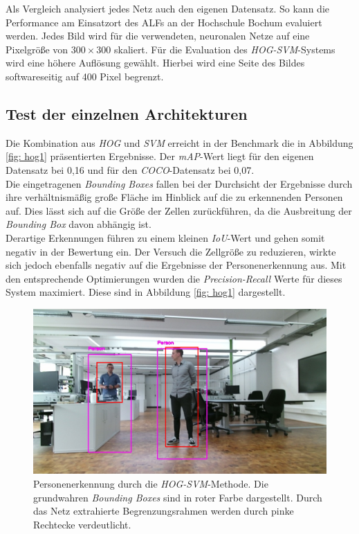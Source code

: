Als Vergleich analysiert jedes Netz auch den eigenen Datensatz. So kann die Performance am Einsatzort des ALFs an der Hochschule Bochum evaluiert werden. Jedes Bild wird für die verwendeten, neuronalen Netze auf eine Pixelgröße von $300 \times 300$ skaliert. Für die Evaluation des \textit{HOG-SVM}-Systems wird eine höhere Auflösung gewählt. Hierbei wird eine Seite des Bildes softwareseitig auf 400 Pixel begrenzt.

\subsection{Test der einzelnen Architekturen}

Die Kombination aus \textit{HOG} und \textit{SVM} erreicht in der Benchmark die in Abbildung \ref{fig: hog1} präsentierten Ergebnisse. Der \textit{mAP}-Wert liegt für den eigenen Datensatz bei 0,16 und für den \textit{COCO}-Datensatz bei 0,07.\\






 Die eingetragenen \textit{Bounding Boxes} fallen bei der Durchsicht der Ergebnisse durch ihre verhältnismäßig große Fläche im Hinblick auf die zu erkennenden Personen auf. Dies lässt sich auf die Größe der Zellen zurückführen, da die Ausbreitung der \textit{Bounding Box} davon abhängig ist.\\
 
 Derartige Erkennungen führen zu einem kleinen \textit{IoU}-Wert und gehen somit negativ in der Bewertung ein. Der Versuch die Zellgröße zu reduzieren, wirkte sich jedoch ebenfalls negativ auf die Ergebnisse der Personenerkennung aus. Mit den entsprechende Optimierungen wurden die \textit{Precision-Recall} Werte für dieses System maximiert. Diese sind in Abbildung \ref{fig: hog1} dargestellt.\\
	\begin{figure}[H]
	\centering
	\includegraphics[width=1\textwidth]{Bilder/iouhog.png}
	\caption{Personenerkennung durch die \textit{HOG-SVM}-Methode. Die grundwahren \textit{Bounding Boxes} sind in roter Farbe dargestellt. Durch das Netz extrahierte Begrenzungsrahmen werden durch pinke Rechtecke verdeutlicht.}
	\label{fig: hogiou}
\end{figure}

